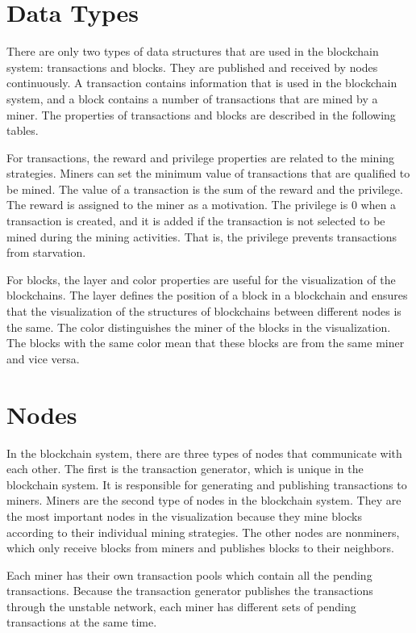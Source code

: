 \section{Data Types}

There are only two types of data structures that are used in the blockchain system: transactions and blocks. They are published and received by nodes continuously. A transaction contains information that is used in the blockchain system, and a block contains a number of transactions that are mined by a miner. The properties of transactions and blocks are described in the following tables.

For transactions, the reward and privilege properties are related to the mining strategies. Miners can set the minimum value of transactions that are qualified to be mined. The value of a transaction is the sum of the reward and the privilege. The reward is assigned to the miner as a motivation. The privilege is 0 when a transaction is created, and it is added if the transaction is not selected to be mined during the mining activities. That is, the privilege prevents transactions from starvation.

For blocks, the layer and color properties are useful for the visualization of the blockchains. The layer defines the position of a block in a blockchain and ensures that the visualization of the structures of blockchains between different nodes is the same. The color distinguishes the miner of the blocks in the visualization. The blocks with the same color mean that these blocks are from the same miner and vice versa.

\section{Nodes}

In the blockchain system, there are three types of nodes that communicate with each other. The first is the transaction generator, which is unique in the blockchain system. It is responsible for generating and publishing transactions to miners. Miners are the second type of nodes in the blockchain system. They are the most important nodes in the visualization because they mine blocks according to their individual mining strategies. The other nodes are nonminers, which only receive blocks from miners and publishes blocks to their neighbors.

Each miner has their own transaction pools which contain all the pending transactions. Because the transaction generator publishes the transactions through the unstable network, each miner has different sets of pending transactions at the same time.

